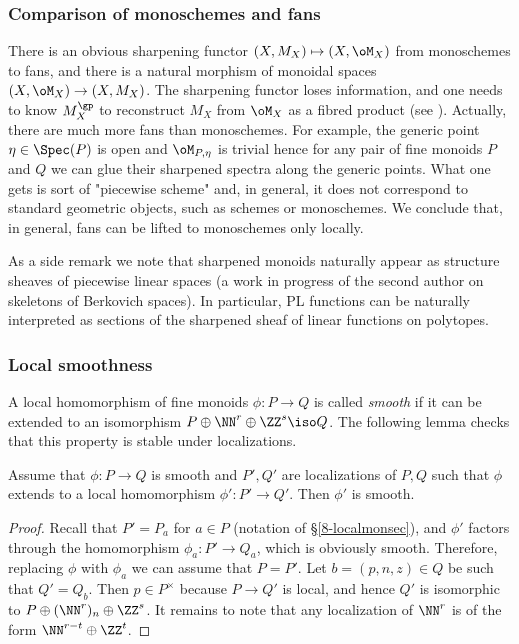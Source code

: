 \documentclass[10pt]{../fichiers-configuration-latex/smfart}
\begin{document}
\subsubsection{Comparison of monoschemes and
fans}\label{8-comparesec} There is an obvious sharpening functor
$(X,{M}_X)\mapsto(X,\oM_X)$ from monoschemes to fans, and there is
a natural morphism of monoidal spaces $(X,\oM_X)\to(X,M_X)$. The
sharpening functor loses information, and one needs to know
${M}_X^\gp$ to reconstruct ${M}_X$ from $\oM_X$ as a fibred product
(see \cite[2.1.8.3]{Ogus@book}). Actually, there are much more fans
than monoschemes. For example, the generic point $\eta\in\Spec(P)$
is open and $\oM_{P,\eta}$ is trivial hence for any pair of fine
monoids $P$ and $Q$ we can glue their sharpened spectra along the
generic points. What one gets is sort of "piecewise scheme" and,
in general, it does not correspond to standard geometric objects,
such as schemes or monoschemes. We conclude that, in general,
fans can be lifted to monoschemes only locally.

\begin{remark2} As a side remark we note that sharpened monoids
naturally appear as structure sheaves of piecewise linear spaces
(a work in progress of the second author on skeletons of Berkovich
spaces). In particular, PL functions can be naturally interpreted
as sections of the sharpened sheaf of linear functions on polytopes.
\end{remark2}

\subsubsection{Local smoothness}\label{8-localsmoothfansec}
A local homomorphism of fine monoids $\phi{\colon}P\to Q$
is called {\em smooth} if it can be extended to an isomorphism
$P\oplus\NN^r\oplus\ZZ^s\iso Q$. The following lemma checks
that this property is stable under localizations.

\begin{lemma2}\label{8-smoothmonoidlem} Assume that $\phi{\colon}P\to
Q$ is smooth and $P',Q'$ are localizations of $P,Q$ such that $\phi$
extends to a local homomorphism $\phi'{\colon}P'\to Q'$. Then $\phi'$
is smooth.  \end{lemma2} \begin{proof} Recall that $P'=P_a$ for $a\in
P$ (notation of \S\ref{8-localmonsec}), and $\phi'$ factors through
the homomorphism $\phi_a{\colon}P'\to Q_a$, which is obviously
smooth. Therefore, replacing $\phi$ with $\phi_a$ we can assume
that $P=P'$. Let $b=(p,n,z)\in Q$ be such that $Q'=Q_b$. Then $p\in
P^\times$ because $P\to Q'$ is local, and hence $Q'$ is isomorphic
to $P\oplus(\NN^r)_n\oplus\ZZ^s$. It remains to note that any
localization of $\NN^r$ is of the form $\NN^{r-t}\oplus\ZZ^t$.
\end{proof}
\end{document}
